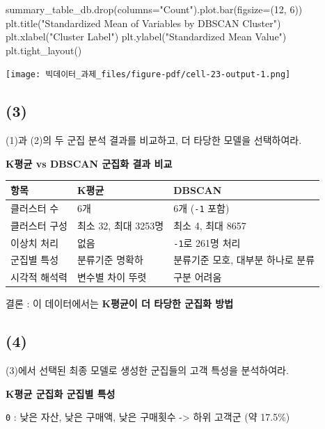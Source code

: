 \documentclass[
  a4paper,
  DIV=11,
  numbers=noendperiod]{scrreprt}
\newenvironment{Shaded}{\begin{snugshade}}{\end{snugshade}}
\newcommand{\DecValTok}[1]{\textcolor[rgb]{0.68,0.00,0.00}{#1}}
\newcommand{\NormalTok}[1]{\textcolor[rgb]{0.00,0.23,0.31}{#1}}
\newcommand{\OperatorTok}[1]{\textcolor[rgb]{0.37,0.37,0.37}{#1}}
\newcommand{\StringTok}[1]{\textcolor[rgb]{0.13,0.47,0.30}{#1}}
\begin{document}
\begin{Shaded}
\begin{Highlighting}[]
\NormalTok{summary\_table\_db.drop(columns}\OperatorTok{=}\StringTok{"Count"}\NormalTok{).plot.bar(figsize}\OperatorTok{=}\NormalTok{(}\DecValTok{12}\NormalTok{, }\DecValTok{6}\NormalTok{))}
\NormalTok{plt.title(}\StringTok{"Standardized Mean of Variables by DBSCAN Cluster"}\NormalTok{)}
\NormalTok{plt.xlabel(}\StringTok{"Cluster Label"}\NormalTok{)}
\NormalTok{plt.ylabel(}\StringTok{"Standardized Mean Value"}\NormalTok{)}
\NormalTok{plt.tight\_layout()}
\end{Highlighting}
\end{Shaded}

\texttt{[image: 빅데이터\_과제\_files/figure-pdf/cell-23-output-1.png]}

\subsection{(3)}\label{section-5}

(1)과 (2)의 두 군집 분석 결과를 비교하고, 더 타당한 모델을 선택하여라.

\textbf{K평균 vs DBSCAN 군집화 결과 비교}

\begin{longtable}[]{@{}lll@{}}
\toprule\noalign{}
항목 & K평균 & DBSCAN \\
\midrule\noalign{}
\endhead
\bottomrule\noalign{}
\endlastfoot
클러스터 수 & 6개 & 6개 (\texttt{-1} 포함) \\
클러스터 구성 & 최소 32, 최대 3253명 & 최소 4, 최대 8657 \\
이상치 처리 & 없음 & \texttt{-1}로 261명 처리 \\
군집별 특성 & 분류기준 명확하 & 분류기준 모호, 대부분 하나로 분류 \\
시각적 해석력 & 변수별 차이 뚜렷 & 구분 어려움 \\
\end{longtable}

결론 : 이 데이터에서는 \textbf{K평균이 더 타당한 군집화 방법}

\subsection{(4)}\label{section-6}

(3)에서 선택된 최종 모델로 생성한 군집들의 고객 특성을 분석하여라.

\textbf{K평균 군집화 군집별 특성}

\texttt{0} : 낮은 자산, 낮은 구매액, 낮은 구매횟수 -\textgreater{} 하위
고객군 (약 17.5\%)
\end{document}
